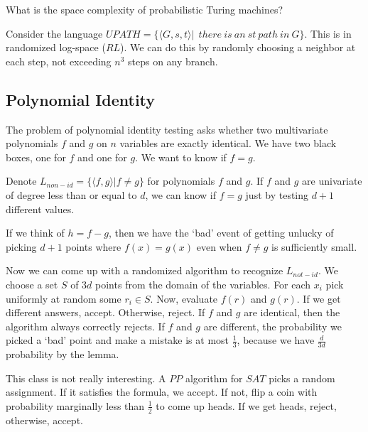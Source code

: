 What is the space complexity of probabilistic Turing machines?

Consider the language $UPATH = \{ \langle G,s,t \rangle | \ \ there \ is \ an \ st \ path \ in \ G     \}$.  This is in randomized log-space ($RL$).  We can do this by randomly choosing a neighbor at each step, not exceeding $n^3$ steps on any branch.




\subsection*{Polynomial Identity}
The problem of polynomial identity testing asks whether two multivariate polynomials $f$ and $g$ on $n$ variables are exactly identical.  We have two black boxes, one for $f$ and one for $g$.  We want to know if $f=g$.

Denote $L_{non-id}=\{ \langle f, g \rangle | f\neq g   \}$ for polynomials $f$ and $g$.  If $f$ and $g$ are univariate of degree less than or equal to $d$, we can know if $f=g$ just by testing $d+1$ different values.  




If we think of $h=f-g$, then we have the `bad' event of getting unlucky of picking $d+1$ points where $f(x)=g(x)$ even when $f\neq g$ is sufficiently small.

Now we can come up with a randomized algorithm to recognize $L_{not-id}$.  We choose a set $S$ of $3d$ points from the domain of the variables.  For each $x_i$ pick uniformly at random some $r_i\in S$.  Now, evaluate $f(r)$ and $g(r)$.  If we get different answers, accept.  Otherwise, reject.  If $f$ and $g$ are identical, then the algorithm always correctly rejects.  If $f$ and $g$ are different, the probability we picked a `bad' point and make a mistake is at most $\frac{1}{3}$, because we have $\frac{d}{3d}$ probability by the lemma.



This class is not really interesting.  A $PP$ algorithm for $SAT$ picks a random assignment.  If it satisfies the formula, we accept.  If not, flip a coin with probability marginally less than $\frac{1}{2}$ to come up heads.  If we get heads, reject, otherwise, accept.

